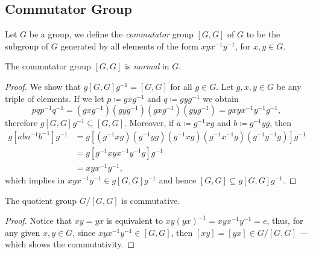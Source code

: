 \subsection{Commutator Group}

\begin{definition}
    \label{def:commutator-group}
    Let \(G\) be a group, we define the \emph{commutator} group \([G, G]\) of \(G\)
    to be the subgroup of \(G\) generated by all elements of the form \(x y x^{-1}
    y^{-1}\), for \(x, y \in G\).
\end{definition}

\begin{lemma}
    \label{lem:commutator-is-normal}
    The commutator group \([G, G]\) is \emph{normal} in \(G\).
\end{lemma}

\begin{proof}
    We show that \(g [G, G] g^{-1} = [G, G]\) for all \(g \in G\). Let \(g, x, y \in
    G\) be any triple of elements. If we let \(p \coloneq g x g^{-1}\) and \(q
    \coloneq g y g^{-1}\) we obtain
    \[
        p q p^{-1} q ^{-1}
        = (g x g^{-1}) (g y g^{-1}) (g x g^{-1}) (g y g^{-1})
        = g x y x^{-1} y^{-1} g^{-1},
    \]
    therefore \(g [G, G] g^{-1} \subseteq [G, G]\). Moreover, if \(a \coloneq g^{-1}
    x g\) and \(b \coloneq g^{-1} y g\), then
    \begin{align*}
        g [a b a^{-1} b^{-1}] g^{-1}
         & = g [
                (g^{-1} x g) (g^{-1} y g) (g^{-1} x g)
                (g^{-1} x^{-1} g) (g^{-1} y^{-1} g)
        ] g^{-1}                                    \\
         & = g [ g^{-1} x y x^{-1} y^{-1} g] g^{-1} \\
         & = x y x^{-1} y^{-1},
    \end{align*}
    which implies in \(x y x^{-1} y^{-1} \in g [G, G] g^{-1}\) and hence \([G, G]
    \subseteq g [G, G] g^{-1}\).
\end{proof}

\begin{lemma}
    \label{lem:grp-modulo-commutator-is-commutative}
    The quotient group \(G/[G, G]\) is commutative.
\end{lemma}

\begin{proof}
    Notice that \(x y = y x\) is equivalent to \(x y (y x)^{-1} = x y x^{-1} y^{-1}
    = e\), thus, for any given \(x, y \in G\), since \(x y x^{-1} y^{-1} \in [G,
        G]\), then \([x y] = [y x] \in G/[G, G]\) --- which shows the commutativity.
\end{proof}

